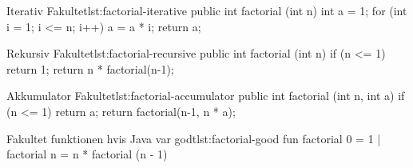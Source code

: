	\begin{JavaCode}{Iterativ Fakultet}{lst:factorial-iterative}
		public int factorial (int n) {
			int a = 1;
			for (int i = 1; i <= n; i++)
				a = a * i;
			return a;
		}
	\end{JavaCode}

	\begin{JavaCode}{Rekursiv Fakultet}{lst:factorial-recursive}
		public int factorial (int n) {
			if (n <= 1)  return 1;
			return n * factorial(n-1);
		}
	\end{JavaCode}

	\begin{JavaCode}{Akkumulator Fakultet}{lst:factorial-accumulator}
		public int factorial (int n, int a) {
			if (n <= 1)  return a;
			return factorial(n-1, n * a);
		}
	\end{JavaCode}

	\begin{JavaCode}{Fakultet funktionen hvis Java var godt}{lst:factorial-good}
		fun factorial 0  =  1
		  | factorial n  =  n * factorial (n - 1)
	\end{JavaCode}

\blindtext
